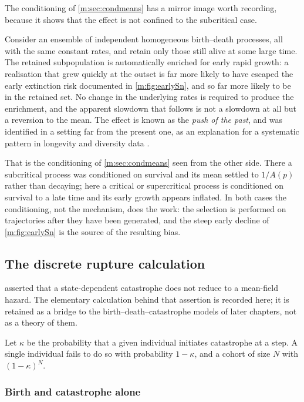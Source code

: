 The conditioning of \cref{m:sec:condmeans} has a mirror image worth recording,
because it shows that the effect is not confined to the subcritical case.

Consider an ensemble of independent homogeneous birth--death processes, all with
the same constant rates, and retain only those still alive at some large time. The
retained subpopulation is automatically enriched for early rapid growth: a
realisation that grew quickly at the outset is far more likely to have escaped the
early extinction risk documented in \cref{m:fig:earlySn}, and so far more likely to
be in the retained set. No change in the underlying rates is required to produce the
enrichment, and the apparent slowdown that follows is not a slowdown at all but a
reversion to the mean. The effect is known as the \emph{push of the past}, and was
identified in a setting far from the present one, as an explanation for a
systematic pattern in longevity and diversity data \cite{Budd2018}.

That is the conditioning of \cref{m:sec:condmeans} seen from the other side. There a
subcritical process was conditioned on survival and its mean settled to $1/A(p)$
rather than decaying; here a critical or supercritical process is conditioned on
survival to a late time and its early growth appears inflated. In both cases the
conditioning, not the mechanism, does the work: the selection is performed on
trajectories after they have been generated, and the steep early decline of
\cref{m:fig:earlySn} is the source of the resulting bias.

\subsection{The discrete rupture calculation}
\label{m:app:discreterupture}

 asserted that a state-dependent catastrophe does not
reduce to a mean-field hazard. The elementary calculation behind that assertion is
recorded here; it is retained as a bridge to the birth--death--catastrophe models
of later chapters, not as a theory of them.

Let $\kappa$ be the probability that a given individual initiates catastrophe at a
step. A single individual fails to do so with probability $1-\kappa$, and a cohort
of size $N$ with $(1-\kappa)^N$.

\subsubsection*{Birth and catastrophe alone}

